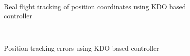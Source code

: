\documentclass[letterpaper%
, twoside%
, 12pt%
,memoire%
, english%
,creativecommons,hyperref%
]{thETS}
\begin{document}
\begin{figure}[H]
	\centering
	 \\ \parbox{0.75\textwidth}{\caption{Real flight tracking of position coordinates using KDO based controller\label{Fig:xyztracKDODist}}}
\end{figure}

\begin{figure}[H]
	\centering
	 \\ \parbox{0.75\textwidth}{\caption{Position tracking errors using KDO based controller\label{Fig:xyzerrKDODist}}}
\end{figure}
\end{document}
